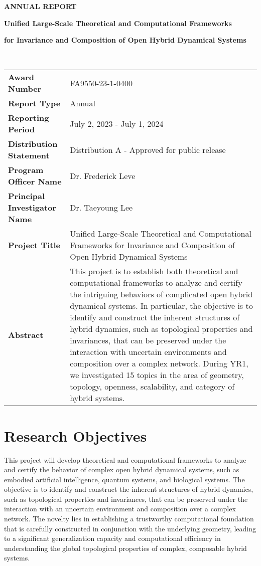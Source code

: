 \documentclass[letterpaper,11pt]{article}
\begin{document}
\thispagestyle{empty}
\noindent\textbf{ANNUAL REPORT}\\[1cm]
\centerline{\textbf{\Large Unified Large-Scale Theoretical and Computational Frameworks}}
\centerline{\textbf{\Large for Invariance and Composition of Open Hybrid Dynamical Systems}}\\[1cm]

\renewcommand\arraystretch{1.5}
\begin{tabularx}{1.0\textwidth}{>{\bfseries}lX}
Award Number & FA9550-23-1-0400\\
Report Type & Annual\\
Reporting Period & July 2, 2023 - July 1, 2024\\
Distribution Statement & Distribution A - Approved for public release\\
Program Officer Name & Dr. Frederick Leve\\
Principal Investigator Name & Dr. Taeyoung Lee\\
Project Title & Unified Large-Scale Theoretical and Computational Frameworks for Invariance and Composition of Open Hybrid Dynamical Systems\\
%
Abstract & This project is to establish both theoretical and computational frameworks to analyze and certify the intriguing behaviors of complicated open hybrid dynamical systems. 
In particular, the objective is to identify and construct the inherent structures of hybrid dynamics, such as topological properties and invariances, that can be preserved under the interaction with uncertain environments and composition over a complex network. 
During YR1, we investigated 15 topics in the area of geometry, topology, openness, scalability, and category of hybrid systems. 
\end{tabularx}

\clearpage\newpage

\tableofcontents

\clearpage\newpage
\setcounter{page}{1}
\section{Research Objectives}
This project will develop theoretical and computational frameworks to analyze and certify the behavior of complex open hybrid dynamical systems, such as embodied artificial intelligence,  quantum systems, and biological systems. 
The objective is to identify and construct the inherent structures of hybrid dynamics, such as topological properties and invariances, that can be preserved under the interaction with an uncertain environment and composition over a complex network.
The novelty lies in establishing a trustworthy computational foundation that is carefully constructed in conjunction with the underlying geometry, leading to a significant generalization capacity and computational efficiency in understanding the global topological properties of complex, composable hybrid systems. 
\end{document}
